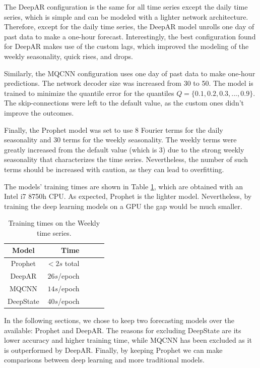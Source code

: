 \documentclass[a4paper, 12pt]{article} %
\newcommand{\ra}[1]{\renewcommand{\arraystretch}{#1}}
\begin{document}
	The DeepAR configuration is the same for all time series except the daily time series, which is simple and can be modeled with a lighter network architecture. Therefore, except for the daily time series, the DeepAR model unrolls one day of past data to make a one-hour forecast. Interestingly, the best configuration found for DeepAR makes use of the custom lags, which improved the modeling of the weekly seasonality, quick rises, and drops. 
	
	Similarly, the MQCNN configuration uses one day of past data to make one-hour predictions. The network decoder size was increased from 30 to 50. The model is trained to minimize the quantile error for the quantiles $Q = \{ 0.1, 0.2, 0.3, ..., 0.9\}$. The skip-connections were left to the default value, as the custom ones didn't improve the outcomes.
	
	Finally, the Prophet model was set to use 8 Fourier terms for the daily seasonality and 30 terms for the weekly seasonality. The weekly terms were greatly increased from the default value (which is 3) due to the strong weekly seasonality that characterizes the time series. Nevertheless, the number of such terms should be increased with caution, as they can lead to overfitting.
	
	The models' training times are shown in Table \ref{table:results_forecasting_training_times}, which are obtained with an Intel i7 8750h CPU. As expected, Prophet is the lighter model. Nevertheless, by training the deep learning models on a GPU the gap would be much smaller.
	
	\begin{table}\centering 
		\ra{1.3}
		\begin{tabular}{@{}crcrc@{}} 
			\midrule
			Model & Time\\
			\midrule
			Prophet & $<2s$ total\\
			DeepAR & $26s$/epoch\\
			MQCNN & $14s$/epoch\\
			DeepState & $40s$/epoch\\
			\bottomrule
		\end{tabular}
		\caption{Training times on the Weekly time series. } \label{table:results_forecasting_training_times}
	\end{table}
	
	
	In the following sections, we chose to keep two forecasting models over the available: Prophet and DeepAR. The reasons for excluding DeepState are its lower accuracy and higher training time, while MQCNN has been excluded as it is outperformed by DeepAR. Finally, by keeping Prophet we can make comparisons between deep learning and more traditional models.	
	
\end{document}
